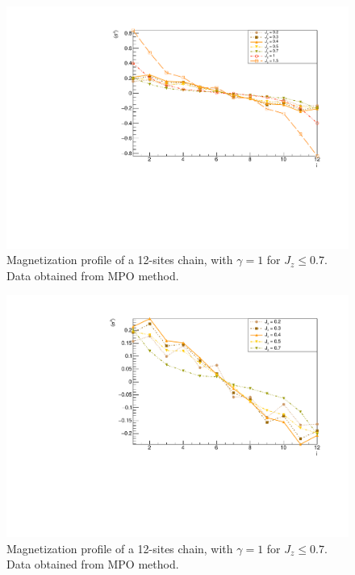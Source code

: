 \begin{figure}[H]
    \centering
    \includegraphics[scale=0.7]{Figures/12sites/12sites_LMvsJz.pdf}
    \caption{Magnetization profile of a 12-sites chain, with $\gamma = 1$ for $J_z \leq 0.7$. Data obtained from MPO method.}
    \label{fig:my_label}
\end{figure}

\begin{figure}[H]
    \centering
    \includegraphics[scale=0.7]{Figures/12sites/12sites_LMvsLOWJz.pdf}
    \caption{Magnetization profile of a 12-sites chain, with $\gamma = 1$ for $J_z \leq 0.7$. Data obtained from MPO method.}
    \label{fig:my_label}
\end{figure}

